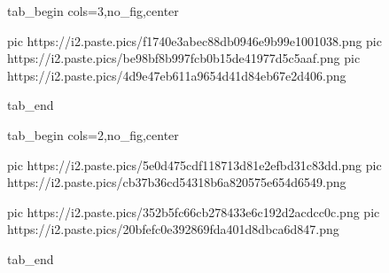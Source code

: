  
 
 
 
 


\ifcmt
  tab_begin cols=3,no_fig,center

	   pic https://i2.paste.pics/f1740e3abec88db0946e9b99e1001038.png
     pic https://i2.paste.pics/be98bf8b997fcb0b15de41977d5c5aaf.png
		 pic https://i2.paste.pics/4d9e47eb611a9654d41d84eb67e2d406.png

  tab_end

  tab_begin cols=2,no_fig,center

		 pic https://i2.paste.pics/5e0d475cdf118713d81e2efbd31c83dd.png
		 pic https://i2.paste.pics/cb37b36cd54318b6a820575e654d6549.png

		 pic https://i2.paste.pics/352b5fc66cb278433e6c192d2acdcc0c.png
		 pic https://i2.paste.pics/20bfefc0e392869fda401d8dbca6d847.png

  tab_end

\fi
